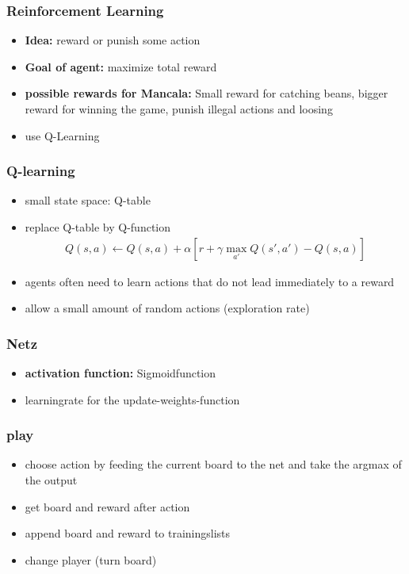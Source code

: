 \documentclass{beamer}
\begin{document}
 \begin{frame}
 \frametitle{Reinforcement Learning}
 \begin{itemize}
 \item \textbf{Idea:} reward or punish some action
 \item \textbf{Goal of agent:} maximize total reward
 \item \textbf{possible rewards for Mancala:} Small reward for catching beans, bigger reward for winning the game, punish illegal actions and loosing
 \item use Q-Learning
 \end{itemize}
 \end{frame}
 
  \begin{frame}
  \frametitle{Q-learning}
 \begin{itemize}
 \item small state space: Q-table
  \item replace Q-table by Q-function 
  \begin{align}
  Q(s,a) \leftarrow Q(s,a)+\alpha [r+\gamma \max_{a'} Q(s',a') -Q(s,a)]
  \end{align}
 \item agents often need to learn actions that do not lead immediately to a reward
 \item allow a small amount of random actions (exploration rate)
 \end{itemize}
 \end{frame}
 
  \begin{frame}
 \frametitle{Netz}
\begin{itemize}
\item \textbf{activation function:} Sigmoidfunction
\item learningrate for the update-weights-function
\end{itemize}
 \end{frame}

 \begin{frame}
 \frametitle{play}
 \begin{itemize}
\item choose action by feeding the current board to the net and take the argmax of the output
\item get board and reward after action 
\item append board and reward to trainingslists
\item change player (turn board)
\end{itemize}
\end{frame}
 
\end{document}
